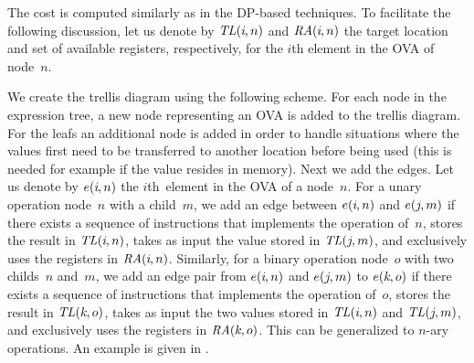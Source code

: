%
The cost is computed similarly as in the \gls{DP}-based techniques.
%
To facilitate the following discussion, let us denote by
\mbox{$\mathit{TL}(i\hspace{-.8pt}, n)$} and \mbox{$\mathit{RA}(i\hspace{-.8pt}, n)$} the
target location and set of available \glspl{register}, respectively, for the
$i$th element in the \gls{OVA} of node~$n$\hspace{-.8pt}.

We create the \gls{trellis diagram} using the following scheme.
%
For each \gls{node} in the \gls{expression tree}, a new \gls{node} representing
an \gls{OVA} is added to the \gls{trellis diagram}.
%
For the \glspl{leaf} an additional \gls{node} is added in order to handle
situations where the values first need to be transferred to another location
before being used (this is needed for example if the value resides in memory).
%
Next we add the \glspl{edge}.
%
Let us denote by \mbox{$e(i\hspace{-.8pt}, n)$} the $i$th~element in the
\gls{OVA} of a \gls{node}~$n$\hspace{-.8pt}.
%
For a unary operation \gls{node}~$n$ with a \gls{child}~$m$\hspace{-.8pt}, we
add an \gls{edge} between \mbox{$e(i\hspace{-.8pt}, n)$} and
\mbox{$e(j\hspace{-1pt}, m)$} if there exists a sequence of \glspl{instruction}
that implements the operation of~$n$\hspace{-.8pt}, stores the result in
\mbox{$\mathit{TL}(i\hspace{-.8pt}, n)$}, takes as input the value stored in
\mbox{$\mathit{TL}(j\hspace{-1pt}, m)$}, and exclusively uses the \glspl{register} in
\mbox{$\mathit{RA}(i\hspace{-.8pt}, n)$}.
%
Similarly, for a binary operation \gls{node}~$o$ with two \glspl{child}~$n$
and~$m$, we add an \gls{edge} pair from \mbox{$e(i\hspace{-.8pt}, n)$} and
\mbox{$e(j\hspace{-1pt}, m)$} to \mbox{$e(k\hspace{-.8pt}, o)$} if there exists
a sequence of \glspl{instruction} that implements the operation of~$o$, stores
the result in \mbox{$\mathit{TL}(k\hspace{-.8pt}, o)$}, takes as input the two values
stored in \mbox{$\mathit{TL}(i\hspace{-.8pt}, n)$} and \mbox{$\mathit{TL}(j\hspace{-1pt},
  m)$}, and exclusively uses the \glspl{register} in
\mbox{$\mathit{RA}(k\hspace{-.8pt}, o)$}.
%
This can be generalized to \mbox{$n$-ary} operations.
%
An example is given in .

